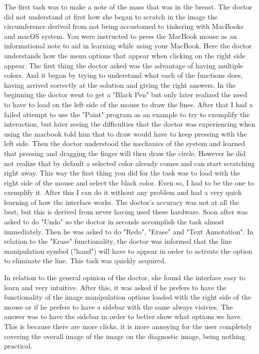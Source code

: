 The first task was to make a note of the mass that was in the breast. The doctor did not understand at first how she began to scratch in the image the circumference derived from not being accustomed to tinkering with MacBooks and macOS system. You were instructed to press the MacBook mouse as an informational note to aid in learning while using your MacBook. Here the doctor understands how the menu options that appear when clicking on the right side appear. The first thing the doctor asked was the advantage of having multiple colors. And it began by trying to understand what each of the functions does, having arrived correctly at the solution and giving the right answers. In the beginning the doctor went to get a "Black Pen" but only later realized the need to have to load on the left side of the mouse to draw the lines. After that I had a failed attempt to use the "Paint" program as an example to try to exemplify the interaction, but later seeing the difficulties that the doctor was experiencing when using the macbook told him that to draw would have to keep pressing with the left side. Then the doctor understood the mechanics of the system and learned that pressing and dragging the finger will then draw the circle. However he did not realize that by default a selected color already comes and can start scratching right away. This way the first thing you did for the task was to load with the right side of the mouse and select the black color. Even so, I had to be the one to exemplify it. After this I can do it without any problem and had a very quick learning of how the interface works. The doctor's accuracy was not at all the best, but this is derived from never having used these hardware. Soon after was asked to do "Undo" so the doctor in seconds accomplish the task almost immediately. Then he was asked to do "Redo", "Erase" and "Text Annotation". In relation to the "Erase" functionality, the doctor was informed that the line manipulation symbol ("hand") will have to appear in order to activate the option to eliminate the line. This task was quickly acquired.

In relation to the general opinion of the doctor, she found the interface easy to learn and very intuitive. After this, it was asked if he prefers to have the functionality of the image manipulation options loaded with the right side of the mouse or if he prefers to have a sidebar with the same always visivies. The answer was to have the sidebar in order to better show what options we have. This is because there are more clicks, it is more annoying for the user completely covering the overall image of the image on the diagnostic image, being nothing practical.

